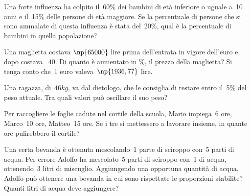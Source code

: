 \begin{multicols}{2}
\begin{esercizio}
Una forte influenza ha colpito il~60\% dei bambini di età
inferiore o uguale a~10 anni e il~15\% delle persone di età maggiore.
Se la percentuale di persone che si sono ammalate di questa influenza
è stata del~20\%, qual è la percentuale di bambini in quella
popolazione?
\end{esercizio}

\begin{esercizio}[\Ast]
 Una maglietta costava $\np{65000}$ lire prima
dell'entrata in vigore dell'euro e dopo costava \officialeuro~$40$. Di
quanto è aumentato in \%, il prezzo della maglietta? Si
tenga conto che~1 euro valeva~$\np{1936,77}$ lire.
\end{esercizio}

\begin{esercizio}
 Una ragazza, di~$46\unit{kg}$, va dal dietologo, che
le consiglia di restare entro il~5\% del peso attuale. Tra
quali valori può oscillare il suo peso?
\end{esercizio}

\begin{esercizio}
Per raccogliere le foglie cadute nel cortile
della scuola, Mario impiega~6 ore, Marco~10 ore,
Matteo~15 ore. Se i tre si mettessero a lavorare
insieme, in quante ore pulirebbero il cortile?
\end{esercizio}

\begin{esercizio}
Una certa bevanda è ottenuta mescolando~1
parte di sciroppo con~5 parti di acqua. Per errore
Adolfo ha mescolato~5 parti di sciroppo con~1 di
acqua, ottenendo~3 litri di miscuglio. Aggiungendo
una opportuna quantità di acqua, Adolfo può ottenere
una bevanda in cui sono rispettate le proporzioni
stabilite? Quanti litri di acqua deve aggiungere?
\end{esercizio}
\end{multicols}

